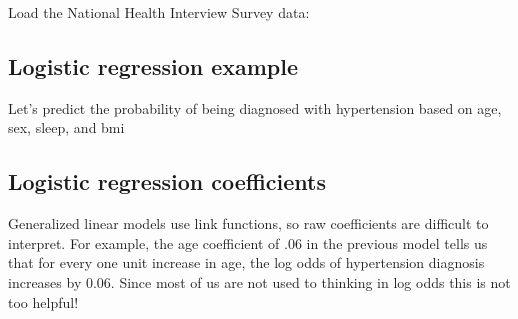 \documentclass[]{book}
\newenvironment{Shaded}{\begin{snugshade}}{\end{snugshade}}
\newcommand{\KeywordTok}[1]{\textcolor[rgb]{0.13,0.29,0.53}{\textbf{#1}}}
\newcommand{\DataTypeTok}[1]{\textcolor[rgb]{0.13,0.29,0.53}{#1}}
\newcommand{\StringTok}[1]{\textcolor[rgb]{0.31,0.60,0.02}{#1}}
\newcommand{\CommentTok}[1]{\textcolor[rgb]{0.56,0.35,0.01}{\textit{#1}}}
\newcommand{\OperatorTok}[1]{\textcolor[rgb]{0.81,0.36,0.00}{\textbf{#1}}}
\newcommand{\NormalTok}[1]{#1}
\begin{document}
Load the National Health Interview Survey data:

\begin{Shaded}
\end{Shaded}

\subsection{Logistic regression
example}\label{logistic-regression-example}

Let's predict the probability of being diagnosed with hypertension based
on age, sex, sleep, and bmi

\begin{Shaded}
\end{Shaded}

\subsection{Logistic regression
coefficients}\label{logistic-regression-coefficients}

Generalized linear models use link functions, so raw coefficients are
difficult to interpret. For example, the age coefficient of .06 in the
previous model tells us that for every one unit increase in age, the log
odds of hypertension diagnosis increases by 0.06. Since most of us are
not used to thinking in log odds this is not too helpful!
\end{document}
